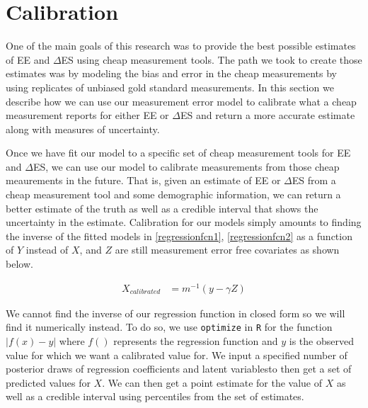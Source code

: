 \documentclass[11pt]{article}\usepackage[]{graphicx}\usepackage[]{color}
\begin{document}
\section{Calibration}

One of the main goals of this research was to provide the best possible estimates of EE and $\Delta$ES using cheap measurement tools. The path we took to create those estimates was by modeling the bias and error in the cheap measurements by using replicates of unbiased gold standard measurements. In this section we describe how we can use our measurement error model to calibrate what a cheap measurement reports for either EE or $\Delta$ES and return a more accurate estimate along with measures of uncertainty. 

Once we have fit our model to a specific set of cheap measurement tools for EE and $\Delta$ES, we can use our model to calibrate measurements from those cheap meaurements in the future. That is, given an estimate of EE or $\Delta$ES from a cheap measurement tool and some demographic information, we can return a better estimate of the truth as well as a credible interval that shows the uncertainty in the estimate. Calibration for our models simply amounts to finding the inverse of the fitted models in \eqref{regressionfcn1}, \eqref{regressionfcn2} as a function of $Y$ instead of $X$, and $Z$ are still measurement error free covariates as shown below.

\begin{align}
  X_{calibrated} &= m^{-1}(y-\gamma Z) 
\end{align}

We cannot find the inverse of our regression function in closed form so we will find it numerically instead. To do so, we use \texttt{optimize} in \texttt{R} for the function $|f(x)-y|$ where $f()$ represents the regression function and $y$ is the observed value for which we want a calibrated value for. We input a specified number of posterior draws of regression coefficients and latent variablesto then get a set of predicted values for $X$. We can then get a point estimate for the value of $X$ as well as a credible interval using percentiles from the set of estimates.
\end{document}
